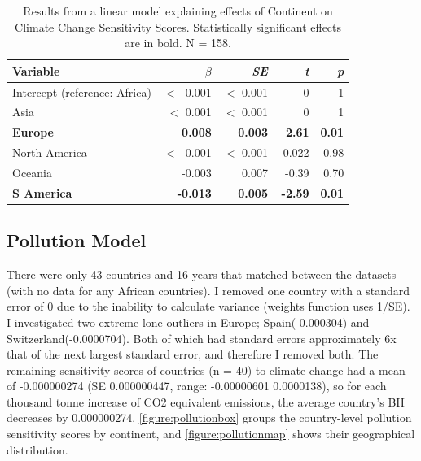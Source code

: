 \documentclass[11pt, a4paper, titlepage]{article}
\begin{document}
	\newpage
	
	\begin{table}[H]
		\begin{center}
			\caption{Results from a linear model explaining effects of Continent on Climate Change Sensitivity Scores. \textmd{Statistically significant effects are in bold. N = 158.}}
			\label{tab:climatetable}
			\begin{tabular}{l|r|r|r|r}
				Variable & $\beta$ & \textit{SE} & \textit{t} & \textit{p}\\
				\hline
				Intercept (reference: Africa) & $<$ -0.001 & $<$ 0.001 & 0 & 1\\
				Asia & $<$ 0.001 & $<$ 0.001& 0 & 1\\
				\textbf{Europe} & \textbf{0.008} & \textbf{0.003} & \textbf{2.61} & \textbf{0.01} \\
				North America & $<$ -0.001 & $<$ 0.001 & -0.022 & 0.98\\
				Oceania & -0.003 & 0.007 & -0.39 & 0.70\\
				\textbf{S America} & \textbf{-0.013} & \textbf{0.005} & \textbf{-2.59} & \textbf{0.01}\\
			\end{tabular}
		\end{center}
	\end{table}
	

	\newpage
	
	\subsection*{Pollution Model}
	
	There were only 43 countries and 16 years that matched between the datasets (with no data for any African countries). I removed one country with a standard error of 0 due to the inability to calculate variance (weights function uses 1/SE). I investigated two extreme lone outliers in Europe; Spain(-0.000304) and Switzerland(-0.0000704). Both of which had standard errors approximately 6x that of the next largest standard error, and therefore I removed both. The remaining sensitivity scores of countries (n = 40) to climate change had a mean of -0.000000274 (SE 0.000000447, range: -0.00000601  0.0000138), so for each thousand tonne increase of CO2 equivalent emissions, the average country's BII decreases by 0.000000274. \autoref{figure:pollutionbox} groups the country-level pollution sensitivity scores by continent, and \autoref{figure:pollutionmap} shows their geographical distribution. \newline
\end{document}
